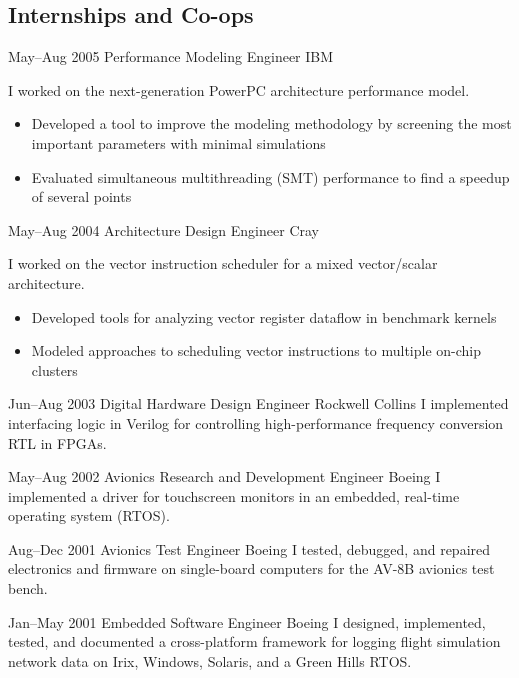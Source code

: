 \documentclass[11pt,a4paper,roman]{moderncv}
\begin{document}
\newpage

\subsection{Internships and Co-ops}

\cventry%
{May--Aug 2005}%
{Performance Modeling Engineer}%
{IBM}%
{\austin}%
{}%
{I worked on the next-generation PowerPC architecture performance model.
\begin{itemize}
\item Developed a tool to improve the modeling methodology by screening the most important parameters with minimal simulations
\item Evaluated simultaneous multithreading (SMT) performance to find a speedup of several points
\end{itemize}}

\cventry%
{May--Aug 2004}%
{Architecture Design Engineer}%
{Cray}%
{\chippewafalls}%
{}%
{I worked on the vector instruction scheduler for a mixed vector/scalar architecture.
\begin{itemize}
\item Developed tools for analyzing vector register dataflow in benchmark kernels
\item Modeled approaches to scheduling vector instructions to multiple on-chip clusters
\end{itemize}}

\cventry%
{Jun--Aug 2003}%
{Digital Hardware Design Engineer}%
{Rockwell Collins}%
{\whitemarsh}%
{}%
{I implemented interfacing logic in Verilog for controlling high-performance frequency conversion RTL in FPGAs.}

\cventry%
{May--Aug 2002}%
{Avionics Research and Development Engineer}%
{Boeing}%
{\stlouis}%
{}%
{I implemented a driver for touchscreen monitors in an embedded, real-time operating system (RTOS).}

\cventry%
{Aug--Dec 2001}%
{Avionics Test Engineer}%
{Boeing}%
{\stlouis}%
{}%
{I tested, debugged, and repaired electronics and firmware on single-board computers for the AV-8B avionics test bench.}

\cventry%
{Jan--May 2001}%
{Embedded Software Engineer}%
{Boeing}%
{\stlouis}%
{}%
{I designed, implemented, tested, and documented a cross-platform \Cpp framework for logging flight simulation network data on Irix, Windows, Solaris, and a Green Hills RTOS.}
\end{document}

